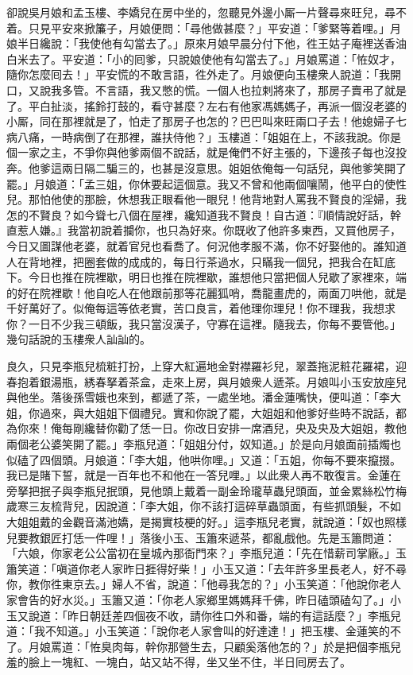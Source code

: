 卻說吳月娘和孟玉樓、李嬌兒在房中坐的，忽聽見外邊小厮一片聲尋來旺兒，尋不着。只見平安來掀簾子，月娘便問：「尋他做甚麼？」平安道：「爹緊等着哩。」月娘半日纔說：「我使他有勾當去了。」原來月娘早晨分付下他，徃王姑子庵裡送香油白米去了。平安道：「小的囘爹，只說娘使他有勾當去了。」月娘罵道：「恠奴才，隨你怎麼囘去！」平安慌的不敢言語，徃外走了。{}月娘便向玉樓衆人說道：「我開口，又說我多管。不言語，我又憋的慌。一個人也拉剌將來了，那房子賣弔了就是了。平白扯淡，搖鈴打鼓的，看守甚麼？左右有他家馮媽媽子，再派一個沒老婆的小厮，同在那裡就是了，怕走了那房子也怎的？巴巴叫來旺兩口子去！他媳婦子七病八痛，{}一時病倒了在那裡，誰扶侍他？」玉樓道：「姐姐在上，不該我說。你是個一家之主，不爭你與他爹兩個不說話，就是俺們不好主張的，下邊孩子每也沒投奔。他爹這兩日隔二騙三的，也甚是沒意思。姐姐依俺每一句話兒，與他爹笑開了罷。」月娘道：「孟三姐，你休要起這個意。我又不曾和他兩個嚷鬧，他平白的使性兒。那怕他使的那臉，休想我正眼看他一眼兒！他背地對人罵我不賢良的淫婦，我怎的不賢良？如今聳七八個在屋裡，纔知道我不賢良！自古道：『順情說好話，幹直惹人嫌。』我當初說着攔你，也只為好來。你既收了他許多東西，又買他房子，今日又圖謀他老婆，就着官兒也看喬了。何況他孝服不滿，你不好娶他的。誰知道人在背地裡，把圈套做的成成的，每日行茶過水，只瞞我一個兒，把我合在缸底下。今日也推在院裡歇，明日也推在院裡歇，誰想他只當把個人兒歇了家裡來，端的好在院裡歇！他自吃人在他跟前那等花麗狐哨，喬龍畫虎的，{}兩面刀哄他，就是千好萬好了。似俺每這等依老實，苦口良言，着他理你理兒！你不理我，我想求你？一日不少我三頓飯，我只當沒漢子，守寡在這裡。{}隨我去，你每不要管他。」幾句話說的玉樓衆人訕訕的。

良久，只見李瓶兒梳粧打扮，上穿大紅遍地金對襟羅衫兒，翠蓋拖泥粧花羅裙，迎春抱着銀湯瓶，綉春拏着茶盒，走來上房，與月娘衆人遞茶。月娘叫小玉安放座兒與他坐。落後孫雪娥也來到，都遞了茶，一處坐地。潘金蓮嘴快，便叫道：「李大姐，你過來，與大姐姐下個禮兒。實和你說了罷，大姐姐和他爹好些時不說話，都為你來！俺每剛纔替你勸了恁一日。你改日安排一席酒兒，央及央及大姐姐，教他兩個老公婆笑開了罷。」李瓶兒道：「姐姐分付，奴知道。」於是向月娘面前插燭也似磕了四個頭。月娘道：「李大姐，他哄你哩。」又道：「五姐，你每不要來攛掇。我已是賭下誓，就是一百年也不和他在一答兒哩。」以此衆人再不敢復言。金蓮在旁拏把抿子與李瓶兒抿頭，見他頭上戴着一副金玲瓏草蟲兒頭面，並金累絲松竹梅歲寒三友梳背兒，因說道：「李大姐，你不該打這碎草蟲頭面，有些抓頭髮，不如大姐姐戴的金觀音滿池嬌，是揭實枝梗的好。」{}這李瓶兒老實，就說道：「奴也照樣兒要教銀匠打恁一件哩！」落後小玉、玉簫來遞茶，都亂戲他。先是玉簫問道：「六娘，你家老公公當初在皇城內那衙門來？」李瓶兒道：「先在惜薪司掌廠。」玉簫笑道：「嗔道你老人家昨日捱得好柴！」小玉又道：「去年許多里長老人，好不尋你，教你徃東京去。」婦人不省，說道：「他尋我怎的？」小玉笑道：「他說你老人家會告的好水災。」玉簫又道：「你老人家鄉里媽媽拜千佛，昨日磕頭磕勾了。」小玉又說道：「昨日朝廷差四個夜不收，請你徃口外和番，端的有這話麼？」李瓶兒道：「我不知道。」小玉笑道：「說你老人家會叫的好達達！」把玉樓、金蓮笑的不了。月娘罵道：「恠臭肉每，幹你那營生去，只顧奚落他怎的？」於是把個李瓶兒羞的臉上一塊紅、一塊白，站又站不得，坐又坐不住，{}半日囘房去了。

